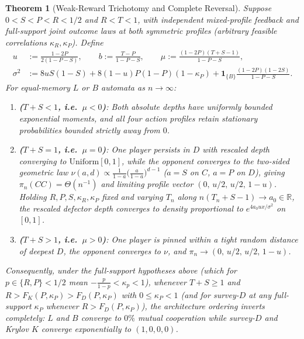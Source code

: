 \documentclass[11pt,reqno]{amsart}
\newtheorem{theorem}{Theorem}[section]
\theoremstyle{definition}
\theoremstyle{remark}
\newcommand{\R}{\mathbb{R}}
\newcommand{\one}{\mathbf{1}}
\begin{document}
\begin{theorem}[Weak-Reward Trichotomy and Complete Reversal]\label{thm:weak}
Suppose $0 < S < P < R < 1/2$ and $R < T < 1$, with independent mixed-profile feedback and full-support joint outcome laws at both symmetric profiles (arbitrary feasible correlations $\kappa_R, \kappa_P$). Define
\begin{equation}\label{eq:weak-params}
\begin{aligned}
  u &:= \frac{1-2P}{2(1-P-S)}, \qquad
  b := \frac{T-P}{1-P-S}, \qquad
  \mu := \frac{(1-2P)(T+S-1)}{1-P-S}, \\
  \sigma^2 &:= 8 u S(1-S) + 8(1-u) P(1-P)(1-\kappa_P) + \one_{\{B\}}\frac{(1-2P)(1-2S)}{1-P-S}.
\end{aligned}
\end{equation}
For equal-memory $L$ or $B$ automata as $n \to \infty$:
\begin{enumerate}
  \item \textbf{($T + S < 1$, i.e.\ $\mu < 0$)}: Both absolute depths have uniformly bounded exponential moments, and all four action profiles retain stationary probabilities bounded strictly away from $0$.
  \item \textbf{($T + S = 1$, i.e.\ $\mu = 0$)}: One player persists in $D$ with rescaled depth converging to $\mathrm{Uniform}[0,1]$, while the opponent converges to the two-sided geometric law $\nu(a,d) \propto \frac{1}{1-a}\bigl(\frac{a}{1-a}\bigr)^{d-1}$ ($a=S$ on $C$, $a=P$ on $D$), giving $\pi_n(CC) = \Theta(n^{-1})$ and limiting profile vector $(0,\, u/2,\, u/2,\, 1-u)$. Holding $R, P, S, \kappa_R, \kappa_P$ fixed and varying $T_n$ along $n(T_n + S - 1) \to a_0 \in \R$, the rescaled defector depth converges to density proportional to $e^{4 a_0 u x/\sigma^2}$ on $[0,1]$.
  \item \textbf{($T + S > 1$, i.e.\ $\mu > 0$)}: One player is pinned within a tight random distance of deepest $D$, the opponent converges to $\nu$, and $\pi_n \to (0,\, u/2,\, u/2,\, 1-u)$.
\end{enumerate}
Consequently, under the full-support hypotheses above (which for $p \in \{R, P\} < 1/2$ mean $-\frac{p}{1-p} < \kappa_p < 1$), whenever $T + S \ge 1$ and $R > F_K(P,\kappa_P) > F_D(P,\kappa_P)$ with $0 \le \kappa_P < 1$ (and for survey-$D$ at any full-support $\kappa_P$ whenever $R > F_D(P,\kappa_P)$), the architecture ordering inverts completely: $L$ and $B$ converge to $0\%$ mutual cooperation while survey-$D$ and Krylov $K$ converge exponentially to $(1, 0, 0, 0)$.
\end{theorem}
\end{document}
